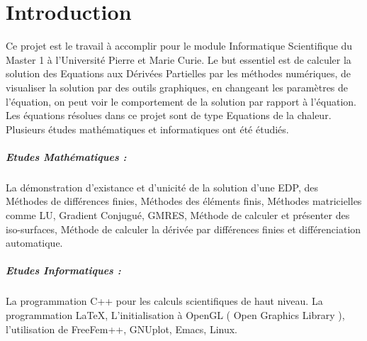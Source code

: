 \documentclass{book}
\begin{document}
\chapter*{Introduction}
Ce projet est le travail à accomplir pour le module Informatique Scientifique du Master 1 à l'Université Pierre et Marie Curie. Le but essentiel est de calculer la solution des Equations aux Dérivées Partielles par les méthodes numériques, de visualiser la solution par des outils graphiques, en changeant les paramètres de l'équation, on peut voir le comportement de la solution par rapport à l'équation. Les équations résolues dans ce projet sont de type Equations de la chaleur. Plusieurs études mathématiques et informatiques ont été étudiés.
\paragraph{Etudes Mathématiques : } La démonstration d'existance et d'unicité de la solution d'une EDP, des Méthodes de différences finies, Méthodes des éléments finis, Méthodes matricielles comme LU, Gradient Conjugué, GMRES, Méthode de calculer et présenter des iso-surfaces, Méthode de calculer la dérivée par différences finies et différenciation automatique.
\paragraph{Etudes Informatiques : } La programmation C++ pour les calculs scientifiques de haut niveau. La programmation \LaTeX{}, L'initialisation à OpenGL ( Open Graphics Library ), l'utilisation de FreeFem++, GNUplot, Emacs, Linux. 
\end{document}
